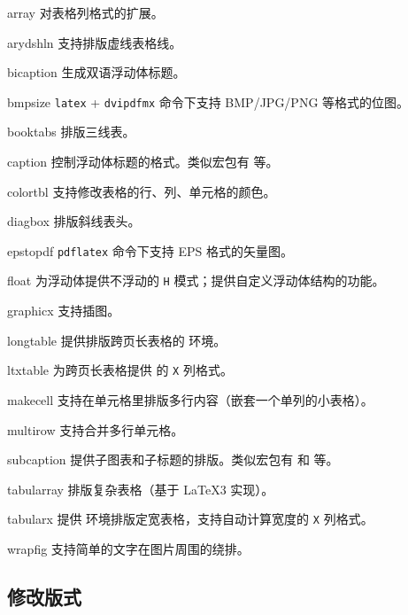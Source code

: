 \begin{pkglist}
  \item[array]      对表格列格式的扩展。
  \item[arydshln]   支持排版虚线表格线。
  \item[bicaption]  生成双语浮动体标题。
  \item[bmpsize]    \texttt{latex} + \texttt{dvipdfmx} 命令下支持 BMP/JPG/PNG 等格式的位图。
  \item[booktabs]   排版三线表。
  \item[caption]    控制浮动体标题的格式。类似宏包有  等。
  \item[colortbl]   支持修改表格的行、列、单元格的颜色。
  \item[diagbox]    排版斜线表头。
  \item[epstopdf]   \texttt{pdflatex} 命令下支持 EPS 格式的矢量图。
  \item[float]      为浮动体提供不浮动的 \texttt{H} 模式；提供自定义浮动体结构的功能。
  \item[graphicx]   支持插图。
  \item[longtable]  提供排版跨页长表格的  环境。
  \item[ltxtable]   为跨页长表格提供  的 \texttt{X} 列格式。
  \item[makecell]   支持在单元格里排版多行内容（嵌套一个单列的小表格）。
  \item[multirow]   支持合并多行单元格。
  \item[subcaption] 提供子图表和子标题的排版。类似宏包有  和  等。
  \item[tabularray] 排版复杂表格（基于 \LaTeX3 实现）。
  \item[tabularx]   提供  环境排版定宽表格，支持自动计算宽度的 \texttt{X} 列格式。
  \item[wrapfig]    支持简单的文字在图片周围的绕排。
\end{pkglist}

\subsection{修改版式}\label{subsec:pkg-layout}

